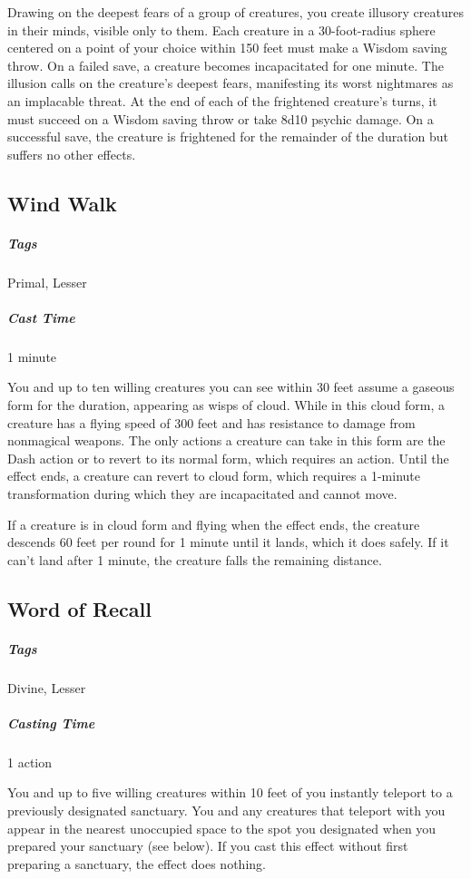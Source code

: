 Drawing on the deepest fears of a group of creatures, you create illusory creatures in their minds, visible only to them. Each creature in a 30-foot-radius sphere centered on a point of your choice within 150 feet must make a Wisdom saving throw. On a failed save, a creature becomes incapacitated for one minute. The illusion calls on the creature’s deepest fears, manifesting its worst nightmares as an implacable threat. At the end of each of the frightened creature’s turns, it must succeed on a Wisdom saving throw or take 8d10 psychic damage. On a successful save, the creature is frightened for the remainder of the duration but suffers no other effects.

\subsection{Wind Walk\label{spell:wind-walk}}
\subparagraph*{Tags} Primal, Lesser
\subparagraph*{Cast Time} 1 minute

You and up to ten willing creatures you can see within 30 feet assume a gaseous form for the duration, appearing as wisps of cloud. While in this cloud form, a creature has a flying speed of 300 feet and has resistance to damage from nonmagical weapons. The only actions a creature can take in this form are the Dash action or to revert to its normal form, which requires an action. Until the effect ends, a creature can revert to cloud form, which requires a 1-minute transformation during which they are incapacitated and cannot move.

If a creature is in cloud form and flying when the effect ends, the creature descends 60 feet per round for 1 minute until it lands, which it does safely. If it can’t land after 1 minute, the creature falls the remaining distance.

\subsection{Word of Recall\label{spell:word-of-recall}}
\subparagraph*{Tags} Divine, Lesser
\subparagraph*{Casting Time} 1 action

You and up to five willing creatures within 10 feet of you instantly teleport to a previously designated sanctuary. You and any creatures that teleport with you appear in the nearest unoccupied space to the spot you designated when you prepared your sanctuary (see below). If you cast this effect without first preparing a sanctuary, the effect does nothing.

